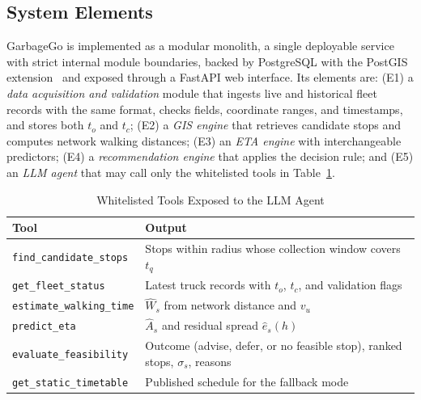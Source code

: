 \subsection{System Elements}
GarbageGo is implemented as a modular monolith, a single deployable service with strict internal module boundaries, backed by PostgreSQL with the PostGIS extension~\cite{postgis} and exposed through a FastAPI web interface. Its elements are: (E1) a \emph{data acquisition and validation} module that ingests live and historical fleet records with the same format, checks fields, coordinate ranges, and timestamps, and stores both $t_o$ and $t_c$; (E2) a \emph{GIS engine} that retrieves candidate stops and computes network walking distances; (E3) an \emph{ETA engine} with interchangeable predictors; (E4) a \emph{recommendation engine} that applies the decision rule; and (E5) an \emph{LLM agent} that may call only the whitelisted tools in Table~\ref{tab:tools}.

\begin{table}[t]
\caption{Whitelisted Tools Exposed to the LLM Agent}
\label{tab:tools}
\centering
\footnotesize
\begin{tabular}{@{}lp{}@{}}
\toprule
Tool & Output \\
\midrule
\texttt{find\_candidate\_stops} & Stops within radius whose collection window covers $t_q$ \\
\texttt{get\_fleet\_status} & Latest truck records with $t_o$, $t_c$, and validation flags \\
\texttt{estimate\_walking\_time} & $\hat{W}_s$ from network distance and $v_u$ \\
\texttt{predict\_eta} & $\hat{A}_s$ and residual spread $\hat{e}_s(h)$ \\
\texttt{evaluate\_feasibility} & Outcome (advise, defer, or no feasible stop), ranked stops, $\sigma_s$, reasons \\
\texttt{get\_static\_timetable} & Published schedule for the fallback mode \\
\bottomrule
\end{tabular}
\end{table}

